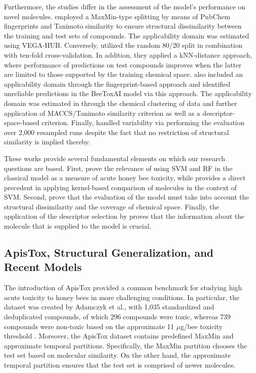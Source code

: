 \documentclass[conference]{IEEEtran}
\begin{document}
Furthermore, the studies differ in the assessment of the model's performance on novel molecules. \cite{carnesecchi2020integrating} employed a MaxMin-type splitting by means of PubChem fingerprints and Tanimoto similarity to ensure structural dissimilarity between the training and test sets of compounds. The applicability domain was estimated using VEGA-HUB. Conversely, \cite{xu2021insilico} utilized the random 80/20 split in combination with ten-fold cross-validation. In addition, they applied a kNN-distance approach, where performance of predictions on test compounds improves when the latter are limited to those supported by the training chemical space. \cite{moreirafilho2021beetoxai} also included an applicability domain through the fingerprint-based approach and identified unreliable predictions in the BeeToxAI model via this approach. The applicability domain was estimated in \cite{sharifi2024insilico} through the chemical clustering of data and further application of MACCS/Tanimoto similarity criterion as well as a descriptor-space-based criterion. Finally, \cite{yang2022randomwalk} handled variability via performing the evaluation over 2,000 resampled runs despite the fact that no restriction of structural similarity is implied thereby.

These works provide several fundamental elements on which our research questions are based. First, \cite{xu2021insilico, moreirafilho2021beetoxai} prove the relevance of using SVM and RF in the classical model as a measure of acute honey bee toxicity, while \cite{yang2022randomwalk} provides a direct precedent in applying kernel-based comparison of molecules in the context of SVM. Second, \cite{carnesecchi2020integrating, sharifi2024insilico} prove that the evaluation of the model must take into account the structural dissimilarity and the coverage of chemical space. Finally, the application of the descriptor selection by \cite{carnesecchi2020integrating, sharifi2024insilico} proves that the information about the molecule that is supplied to the model is crucial.


\subsection{ApisTox, Structural Generalization, and Recent Models}
\label{sec:related-apistox}

The introduction of ApisTox provided a common benchmark for studying high acute toxicity to honey bees in more challenging conditions. In particular, the dataset was created by Adamczyk et al., with 1,035 standardized and deduplicated compounds, of which 296 compounds were toxic, whereas 739 compounds were non-toxic based on the approximate 11 $\mu$g/bee toxicity threshold \cite{adamczyk2025apistox}. Moreover, the ApisTox dataset contains predefined MaxMin and approximate temporal partitions. Specifically, the MaxMin partition chooses the test set based on molecular similarity. On the other hand, the approximate temporal partition ensures that the test set is comprised of newer molecules.
\end{document}
